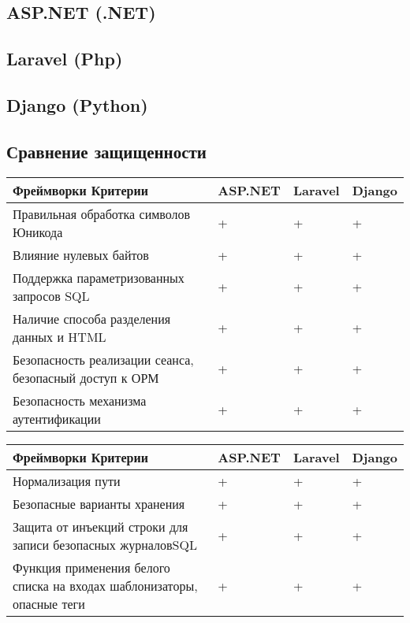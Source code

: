 \newpage
\subsection{ASP.NET (.NET)}


\newpage
\subsection{Laravel (Php)}


\newpage
\subsection{Django (Python)}


\newpage
\subsection{Сравнение защищенности}

\small
\centering
\begin{flushleft}
\begin{tabular}[t]{|p{9cm}|l|l|l|} \hline 
Фреймворки   Критерии& ASP.NET & Laravel & Django\\[3mm]\hline
Правильная обработка символов Юникода & + & + & + \\[2mm]\hline
Влияние нулевых байтов & + & +& + \\[2mm]\hline
Поддержка параметризованных запросов SQL & + & + & +\\[2mm]\hline
Наличие способа разделения данных и HTML & + & + & +\\[2mm]\hline
Безопасность реализации сеанса, безопасный доступ к ОРМ & + & + & +\\[2mm]\hline
Безопасность механизма аутентификации & + & + & +\\[2mm]\hline
\end{tabular}
\end{flushleft}

\centering
\begin{flushleft}
\begin{tabular}[t]{|p{9cm}|l|l|l|} \hline
Фреймворки  Критерии& ASP.NET & Laravel & Django\\[3mm]\hline
Нормализация пути & + & + & + \\[2mm]\hline
Безопасные варианты хранения & + & +& + \\[2mm]\hline
Защита от инъекций строки для записи безопасных журналовSQL & + & + & +\\[2mm]\hline
Функция применения белого списка на входах \newline шаблонизаторы, опасные теги & + & + & +\\[2mm]\hline
\end{tabular}
\end{flushleft}
